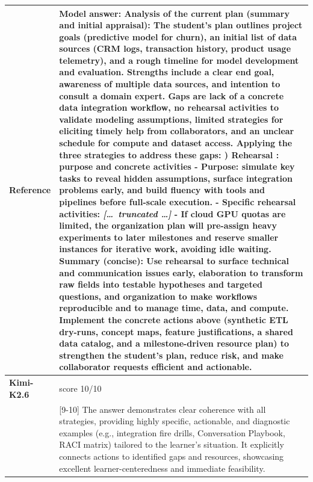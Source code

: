 \begin{longtable}{@{}l p{12.5cm}@{}}
  \textbf{Reference} & Model answer: \newline Analysis of the current plan (summary and initial appraisal): The student's plan outlines project goals (predictive model for churn), an initial list of data sources (CRM logs, transaction history, product usage telemetry), and a rough timeline for model development and evaluation. Strengths include a clear end goal, awareness of multiple data sources, and intention to consult a domain expert. Gaps are lack of a concrete data integration workflow, no rehearsal activities to validate modeling assumptions, limited strategies for eliciting timely help from collaborators, and an unclear schedule for compute and dataset access. \newline Applying the three strategies to address these gaps: \newline 1) Rehearsal : purpose and concrete activities \newline - Purpose: simulate key tasks to reveal hidden assumptions, surface integration problems early, and build fluency with tools and pipelines before full-scale execution. \newline - Specific rehearsal activities: \newline \textit{[\ldots\ truncated \ldots]} \newline - If cloud GPU quotas are limited, the organization plan will pre-assign heavy experiments to later milestones and reserve smaller instances for iterative work, avoiding idle waiting. \newline Summary (concise): Use rehearsal to surface technical and communication issues early, elaboration to transform raw fields into testable hypotheses and targeted questions, and organization to make workflows reproducible and to manage time, data, and compute. Implement the concrete actions above (synthetic ETL dry-runs, concept maps, feature justifications, a shared data catalog, and a milestone-driven resource plan) to strengthen the student's plan, reduce risk, and make collaborator requests efficient and actionable. \\
  \midrule
  \textbf{Kimi-K2.6} & score 10/10 \\
  & [9-10] The answer demonstrates clear coherence with all strategies, providing highly specific, actionable, and diagnostic examples (e.g., integration fire drills, Conversation Playbook, RACI matrix) tailored to the learner's situation. It explicitly connects actions to identified gaps and resources, showcasing excellent learner-centeredness and immediate feasibility. \\

\end{longtable}
